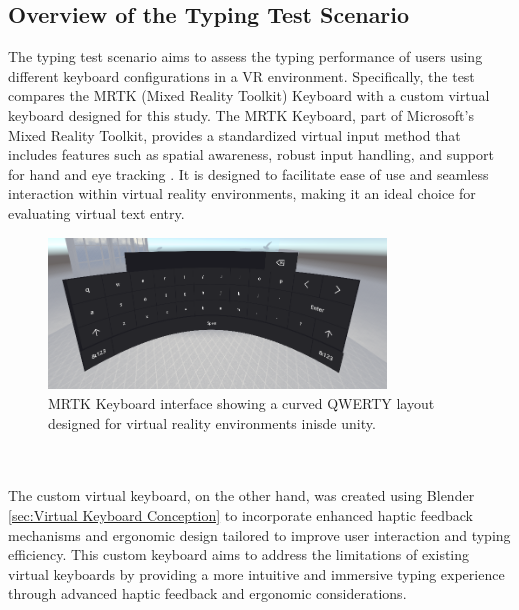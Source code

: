 \subsection{Overview of the Typing Test Scenario}
The typing test scenario aims to assess the typing performance of users using different keyboard configurations in a VR environment. Specifically, the test compares the MRTK (Mixed Reality Toolkit) Keyboard with a custom virtual keyboard designed for this study. The MRTK Keyboard, part of Microsoft's Mixed Reality Toolkit, provides a standardized virtual input method that includes features such as spatial awareness, robust input handling, and support for hand and eye tracking \cite{mrtk_keyboard}. It is designed to facilitate ease of use and seamless interaction within virtual reality environments, making it an ideal choice for evaluating virtual text entry.
\begin{figure}[h]
    \centering
    \includegraphics[width=0.8\textwidth]{Scenario/MRTK_KEyboard.PNG} %
    \caption{ \centering MRTK Keyboard interface showing a curved QWERTY layout designed for virtual reality environments inisde unity.}
    \label{fig:mrtk_keyboard}
\end{figure}\\ \\
The custom virtual keyboard, on the other hand, was created using Blender \ref{sec:Virtual Keyboard Conception} to incorporate enhanced haptic feedback mechanisms and ergonomic design tailored to improve user interaction and typing efficiency. This custom keyboard aims to address the limitations of existing virtual keyboards by providing a more intuitive and immersive typing experience through advanced haptic feedback and ergonomic considerations. 
